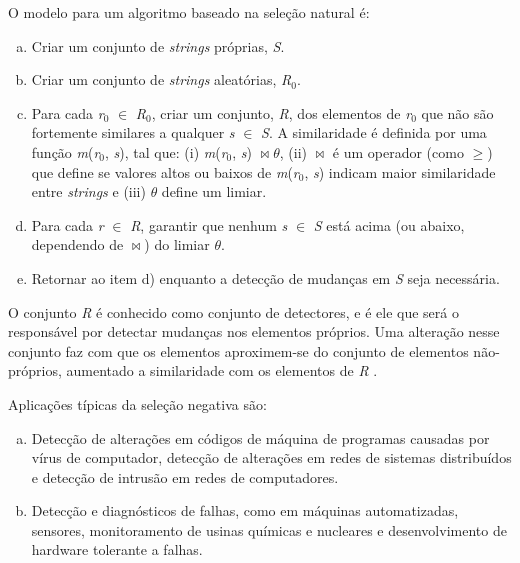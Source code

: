 O modelo para um algoritmo baseado na seleção natural é:

\begin{enumerate}[a)]
    \item Criar um conjunto de \emph{strings} próprias, \emph{S}.
    \item Criar um conjunto de \emph{strings} aleatórias, \emph{R$_{0}$}.
    \item Para cada \emph{r$_{0}$} $\in$ \emph{R$_{0}$}, criar um conjunto, \emph{R}, dos elementos de \emph{r$_{0}$} que não são fortemente similares a qualquer \emph{s} $\in$ \emph{S}. A similaridade é definida por uma função \emph{m}(\emph{r$_{0}$}, \emph{s}), tal que: (i) \emph{m}(\emph{r$_{0}$}, \emph{s}) $\bowtie \theta$, (ii) $\bowtie$ é um operador (como $\ge$) que define se valores altos ou baixos de \emph{m}(\emph{r$_{0}$}, \emph{s}) indicam maior similaridade entre \emph{strings} e (iii) $\theta$ define um limiar.
    \item Para cada \emph{r} $\in$ \emph{R}, garantir que nenhum \emph{s} $\in$ \emph{S} está acima (ou abaixo, dependendo de $\bowtie$) do limiar $\theta$.
    \item Retornar ao item d) enquanto a detecção de mudanças em \emph{S} seja necessária.
\end{enumerate}

O conjunto \emph{R} é conhecido como conjunto de detectores, e é ele que será o responsável por detectar mudanças nos elementos próprios. Uma alteração nesse conjunto faz com que os elementos aproximem-se do conjunto de elementos não-próprios, aumentado a similaridade com os elementos de \emph{R} \cite{Garrett2005}.

Aplicações típicas da seleção negativa são:

\begin{enumerate}[a)]
    \item Detecção de alterações em códigos de máquina de programas causadas por vírus de computador, detecção de alterações em redes de sistemas distribuídos e detecção de intrusão em redes de computadores.
    \item Detecção e diagnósticos de falhas, como em máquinas automatizadas, sensores, monitoramento de usinas químicas e nucleares e desenvolvimento de hardware tolerante a falhas.
\end{enumerate}

